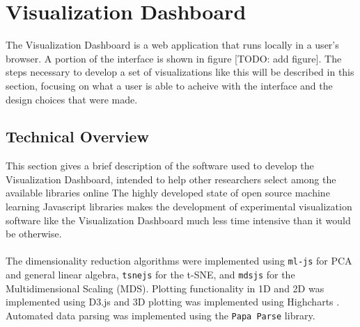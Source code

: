 \documentclass{sigchi}
\begin{document}
%
%
%
%
%







\section{Visualization Dashboard}
The Visualization Dashboard is a web application that runs locally in a user's browser. %
%
A portion of the interface is shown in figure [TODO: add figure]. %
%
The steps necessary to develop a set of visualizations like this will be described in this section, focusing on what a user is able to acheive with the interface and the design choices that were made. %
%
\subsection{Technical Overview}
This section gives a brief description of the software used to develop the Visualization Dashboard, intended to help other researchers select among the available libraries online%
%
The highly developed state of open source machine learning Javascript libraries makes the development of experimental visualization software like the Visualization Dashboard much less time intensive than it would be otherwise.%
%
\\\\
%
The dimensionality reduction algorithms were implemented using \texttt{ml-js} \cite{mljs} for PCA and general linear algebra, \texttt{tsnejs} \cite{tSNEJS} for the t-SNE, and \texttt{mdsjs} \cite{mdsjs} for the Multidimensional Scaling (MDS). %
%
Plotting functionality in 1D and 2D was implemented using D3.js \cite{d3js} and 3D plotting was implemented using Highcharts \cite{highcharts}. %
%
Automated data parsing was implemented using the \texttt{Papa Parse} \cite{papaparse} library.
%
\end{document}
